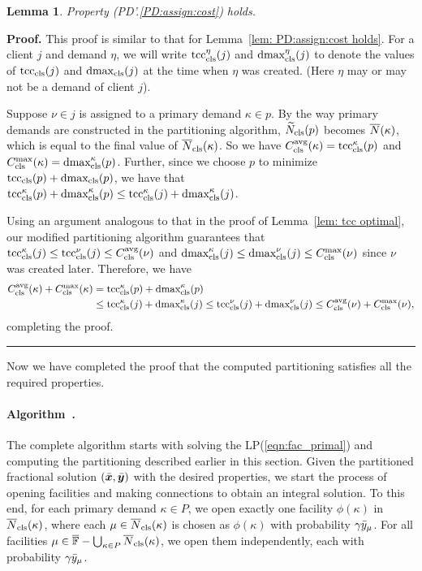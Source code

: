 \documentclass[oneside,final]{ucr}
\newtheorem{lemma}[theorem]{Lemma}
\newenvironment{proof}[1][Proof]{\textbf{#1.} }{\ \rule{0.5em}{0.5em}}
\begin{document}

\begin{lemma}\label{lem: PD1: primary optimal}
  Property (PD'.\ref{PD:assign:cost}) holds.
\end{lemma}
\begin{proof}
This proof is similar to that for Lemma~\ref{lem: PD:assign:cost holds}.
For a client $j$ and demand $\eta$, we will write
$\tcccls^\eta(j)$ and $\dmaxcls^\eta(j)$ to denote the values of
$\tcccls(j)$ and $\dmaxcls(j)$ at the time when $\eta$
was created. (Here $\eta$ may or may not be a demand of client $j$).

Suppose $\nu \in j$ is assigned to a primary demand $\kappa \in p$.
By the way primary demands are constructed in the partitioning
algorithm, $\wtildeclsnb(p)$ becomes $\wbarN(\kappa)$, which is equal
to the final value of $\wbarclsnb(\kappa)$. So we have
$\clsdist(\kappa) = \tcccls^\kappa (p)$ and $\clsmax(\kappa) =
\dmaxcls^\kappa(p)$. Further, since we choose $p$ to minimize
$\tcccls(p) + \dmaxcls(p)$, we have that $\tcccls^\kappa(p) +
\dmaxcls^\kappa(p) \leq \tcccls^\kappa(j) + \dmaxcls^\kappa(j)$.

Using an argument analogous to that in the proof of Lemma~\ref{lem: tcc optimal}, 
our modified partitioning algorithm guarantees that
  $\tcccls^{\kappa}(j) \leq \tcccls^{\nu}(j) \leq \clsdist(\nu)$ and
  $\dmaxcls^{\kappa}(j) \leq \dmaxcls^{\nu}(j) \leq \clsmax(\nu)$ since $\nu$ was
  created later.
  Therefore, we have
%
  \begin{align*}
    \clsdist(\kappa) + \clsmax(\kappa) &= \tcccls^{\kappa}(p) +	\dmaxcls^{\kappa}(p) 
					\\
					&\leq \tcccls^{\kappa}(j) + \dmaxcls^{\kappa}(j) 
					\leq \tcccls^{\nu}(j) + \dmaxcls^{\nu}(j) 
					\leq \clsdist(\nu) + \clsmax(\nu),
  \end{align*}
%
completing the proof.
\end{proof}


Now we have completed the proof that the computed partitioning satisfies
all the required properties. 


\paragraph{Algorithm~{\EBGS}.}
The complete algorithm starts with solving the LP(\ref{eqn:fac_primal}) and
computing the partitioning described earlier in this section.  Given
the partitioned fractional solution $(\barbfx, \barbfy)$ with the
desired properties, we start the process of opening facilities and
making connections to obtain an integral solution. To this end, for
each primary demand $\kappa\in P$, we open exactly one facility
$\phi(\kappa)$ in $\wbarclsnb(\kappa)$, where each
$\mu\in\wbarclsnb(\kappa)$ is chosen as $\phi(\kappa)$ with
probability $\gamma\bary_{\mu}$. For all facilities
$\mu\in\facilityset - \bigcup_{\kappa\in P}\wbarclsnb(\kappa)$, we
open them independently, each with probability
$\gamma\bary_{\mu}$. 
\end{document}
